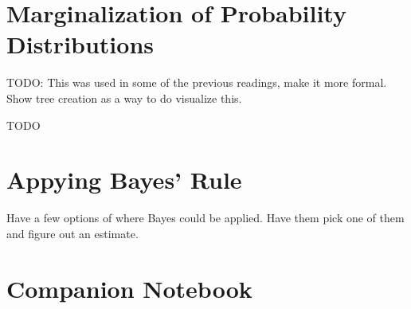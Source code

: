 \documentclass[assignment01_Solutions]{subfiles}
\begin{document}
\section{Marginalization of Probability Distributions}
TODO: This was used in some of the previous readings, make it more formal.   Show tree creation as a way to do visualize this.

\begin{exercise}
TODO
\end{exercise}

\section{Appying Bayes' Rule}

Have a few options of where Bayes could be applied.  Have them pick one of them and figure out an estimate.

\section{Companion Notebook}
\end{document}
